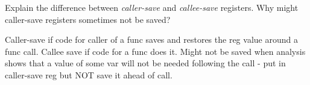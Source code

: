 \documentclass[11pt]{cityexam}
\begin{document}
\begin{questions}
\begin{subquestions}
\subquestion
Explain the difference between \emph{caller-save\/} and \emph{callee-save\/}
registers. Why might caller-save registers sometimes not be saved?
\end{subquestions}

\begin{modelanswer}
Caller-save if code for caller of a func saves and restores the reg value
around a func call. Callee save if code for a func does it. Might not be
saved when analysis shows that a value of some var will not be needed following
the call - put in caller-save reg but NOT save it ahead of call.
\end{modelanswer}

\end{questions}
\end{document}
